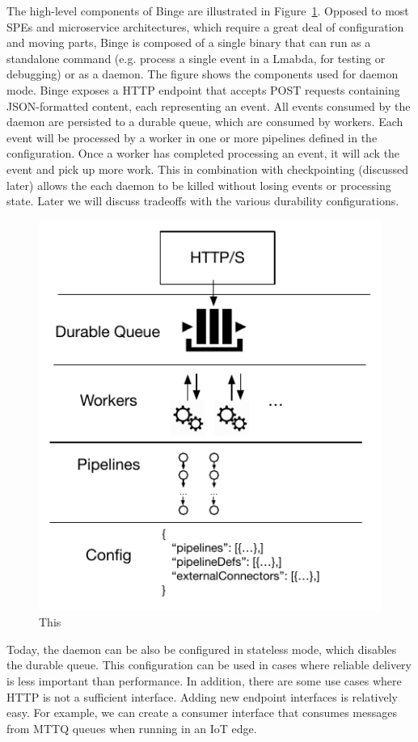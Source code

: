 \documentclass[10pt,twocolumn]{article}
\begin{document}
The high-level components of Binge are illustrated in
Figure~\ref{fig:binge-daemon}.  Opposed to most SPEs and microservice
architectures, which require a great deal of configuration and moving parts,
Binge is composed of a single binary that can run as a standalone command (e.g.
process a single event in a Lmabda, for testing or debugging) or as a daemon.
The figure shows the components used for daemon mode.  Binge exposes a HTTP
endpoint that accepts POST requests containing JSON-formatted content, each
representing an event.  All events consumed by the daemon are persisted to a
durable queue, which are consumed by workers.  Each event will be processed by
a worker in one or more pipelines defined in the configuration.  Once a worker
has completed processing an event, it will ack the event and pick up more work.
This in combination with checkpointing (discussed later) allows the each daemon
to be killed without losing events or processing state.  Later we will discuss
tradeoffs with the various durability configurations. 

\begin{figure}[h]
\centering
\includegraphics[scale=0.60]{figures/binge-daemon.pdf}
\caption{This}
\label{fig:binge-daemon}
\end{figure}

Today, the daemon can be also be configured in stateless mode, which disables the
durable queue.  This configuration can be used in cases where reliable delivery is
less important than performance.  In addition, there are some use cases where HTTP
is not a sufficient interface.  Adding new endpoint interfaces is relatively easy.
For example, we can create a consumer interface that consumes messages from MTTQ
queues when running in an IoT edge.
\end{document}
